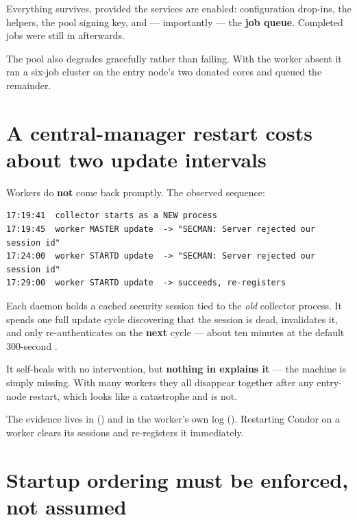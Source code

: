 Everything survives, provided the services are enabled: configuration drop-ins,
the  helpers, the pool signing key, and --- importantly ---
the \textbf{job queue}. Completed jobs were still in 
afterwards.

The pool also degrades gracefully rather than failing. With the worker absent it
ran a six-job cluster on the entry node's two donated cores and queued the
remainder.

\section{A central-manager restart costs about two update intervals}
\label{sec:cmrestart}

Workers do \textbf{not} come back promptly. The observed sequence:

\begin{lstlisting}[style=term]
17:19:41  collector starts as a NEW process
17:19:45  worker MASTER update  -> "SECMAN: Server rejected our session id"
17:24:00  worker STARTD update  -> "SECMAN: Server rejected our session id"
17:29:00  worker STARTD update  -> succeeds, re-registers
\end{lstlisting}

Each daemon holds a cached security session tied to the \emph{old} collector
process. It spends one full update cycle discovering that the session is dead,
invalidates it, and only re-authenticates on the \textbf{next} cycle --- about
ten minutes at the default 300-second .

\begin{trap}
It self-heals with no intervention, but \textbf{nothing in 
explains it} --- the machine is simply missing. With many workers they all
disappear together after any entry-node restart, which looks like a catastrophe
and is not.
\end{trap}

The evidence lives in  () and in the worker's own log (). Restarting Condor on a worker clears its
sessions and re-registers it immediately.

\section{Startup ordering must be enforced, not assumed}

